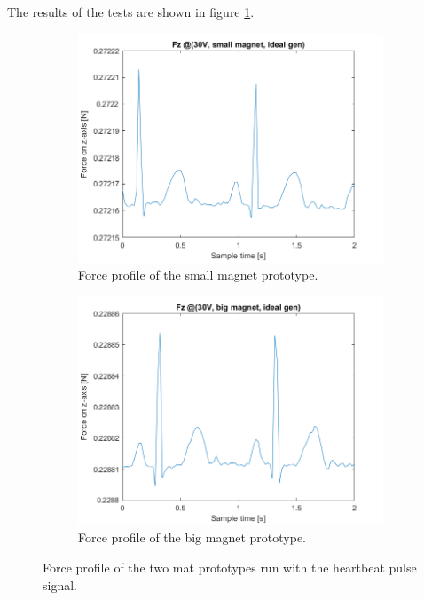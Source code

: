 \begin{samepage}
    The results of the tests are shown in figure \ref{fig: Force_vs_magnet_size}.
    \nopagebreak

    \begin{figure}[H]
        \centering
        \begin{subfigure}[b]{0.475\textwidth}
            \centering
            \includegraphics[width = 1\linewidth]{Chapters/Chapter5/Exp_Evaluation/Figures/Fz_@30V_small_magn_idealgen.png}
            \caption{Force profile of the small magnet prototype.}
        \end{subfigure}
        \begin{subfigure}[b]{0.475\textwidth}
            \centering
            \includegraphics[width = 1\linewidth]{Chapters/Chapter5/Exp_Evaluation/Figures/Fz_@30V_big_magn_idealgen.png}
            \caption{Force profile of the big magnet prototype.}
        \end{subfigure}
        \caption[Heartbeat force profile]{Force profile of the two mat prototypes run with the heartbeat pulse signal.}
        \label{fig: Force_vs_magnet_size}
    \end{figure}
\end{samepage}


